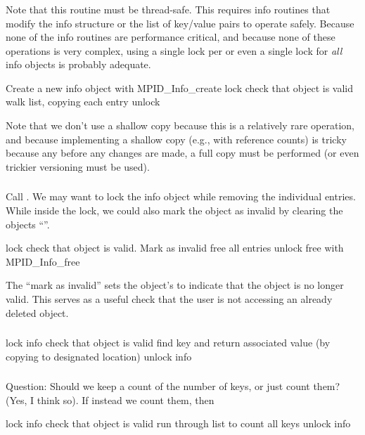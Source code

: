 \documentclass{article}
\begin{document}
\subsubsection{}
Note that this routine must be thread-safe.  This requires info routines that
modify the info structure or the list of key/value pairs to operate safely.
Because none of the info routines are performance critical, and because none
of these operations is very complex, using a single lock per 
or even a single lock for \emph{all} info objects is probably adequate.
\begin{algorithm}
Create a new info object with MPID_Info_create
lock
check that object is valid
walk list, copying each entry
unlock
\end{algorithm}
Note that we don't use a shallow copy because this is a relatively
rare operation, and because implementing a shallow copy (e.g., with
reference counts) is tricky because any before any changes are made,
a full copy must be performed (or even trickier versioning must be
used).

\subsubsection{}
Call .  We may want to lock the info object
while removing the individual entries.  While inside the lock, we
could also mark the object as invalid by clearing the objects
``''.
\begin{algorithm}
lock
check that object is valid.  Mark as invalid
free all entries
unlock
free with MPID_Info_free
\end{algorithm}
The ``mark as invalid'' sets the object's 
to indicate that the object is no longer valid.  
This serves as a
useful check that the user is not accessing an already deleted
object.  

\subsubsection{}
\begin{algorithm}
lock info
check that object is valid
find key and return associated value (by copying to designated location)
unlock info
\end{algorithm}


\subsubsection{}
Question:  Should we keep a count of the number of keys, or just count them?
(Yes, I think so).  If instead we count them, then
\begin{algorithm}
lock info
check that object is valid
run through list to count all keys
unlock info
\end{algorithm}
\end{document}
